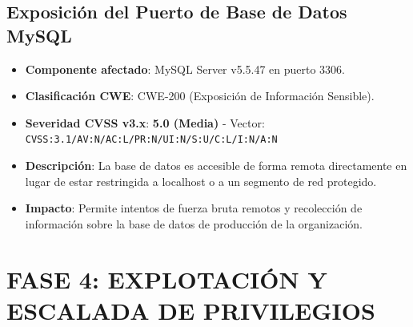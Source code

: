 \documentclass[11pt,a4paper]{article}
\begin{document}
\subsection{Exposición del Puerto de Base de Datos MySQL}
\begin{itemize}
    \item \textbf{Componente afectado}: MySQL Server v5.5.47 en puerto 3306.
    \item \textbf{Clasificación CWE}: CWE-200 (Exposición de Información Sensible).
    \item \textbf{Severidad CVSS v3.x}: \textbf{5.0 (Media)} - Vector: \texttt{CVSS:3.1/AV:N/AC:L/PR:N/UI:N/S:U/C:L/I:N/A:N}
    \item \textbf{Descripción}: La base de datos es accesible de forma remota directamente en lugar de estar restringida a localhost o a un segmento de red protegido.
    \item \textbf{Impacto}: Permite intentos de fuerza bruta remotos y recolección de información sobre la base de datos de producción de la organización.
\end{itemize}


\section{FASE 4: EXPLOTACIÓN Y ESCALADA DE PRIVILEGIOS}
\end{document}

